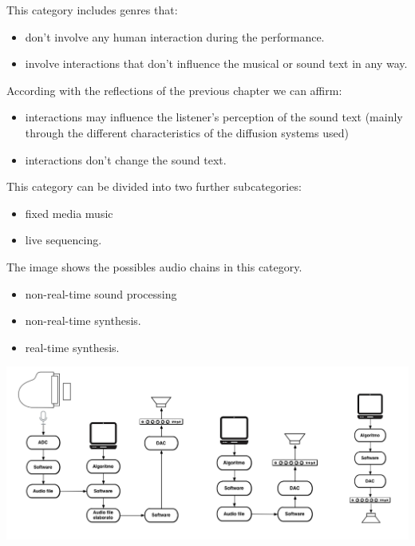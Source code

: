 This category includes genres that:

\begin{itemize}
\tightlist
\item don't involve any human interaction during the performance.\\
\item involve interactions that don't influence the musical or sound text in any way.
\end{itemize}

According with the reflections of the previous chapter we can affirm:

\begin{itemize}
\tightlist
\item interactions may influence the listener's perception of the sound text (mainly through the different characteristics of the diffusion systems used)
\item interactions don't change the sound text.
\end{itemize}

This category can be divided into two further subcategories:

\begin{itemize}
\tightlist
\item fixed media music
\item live sequencing.
\end{itemize}

The image shows the possibles audio chains in this category.

\begin{itemize}
\tightlist
\item non-real-time sound processing
\item non-real-time synthesis.
\item real-time synthesis.
\end{itemize}

\begin{center}
\includegraphics[scale=1]{../img/chains.png}
\end{center}

